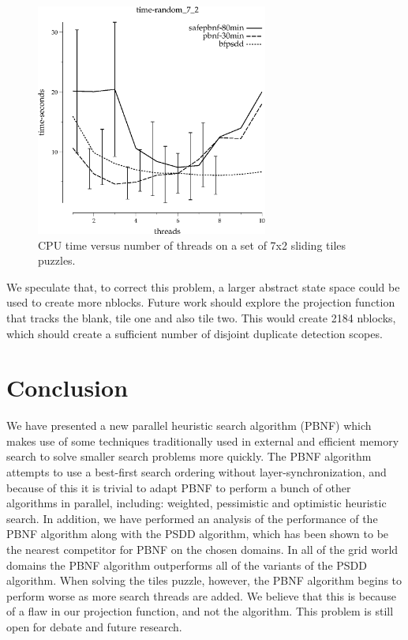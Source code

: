 \documentclass{article}
\begin{document}
\begin{figure}[t]
\begin{center}
\includegraphics[width=3in]{../graphs/tiles_random_7_2/time-random_7_2.eps}
\caption{CPU time versus number of threads on a set of 7x2 sliding
  tiles puzzles.}
\label{fig:tiles-7x2}
\end{center}
\end{figure}

We speculate that, to correct this problem, a larger abstract state
space could be used to create more nblocks.  Future work should
explore the projection function that tracks the blank, tile one and
also tile two.  This would create 2184 nblocks, which should create a
sufficient number of disjoint duplicate detection scopes.

\section{Conclusion}

We have presented a new parallel heuristic search algorithm (PBNF)
which makes use of some techniques traditionally used in external and
efficient memory search to solve smaller search problems more quickly.
The PBNF algorithm attempts to use a best-first search ordering
without layer-synchronization, and because of this it is trivial to
adapt PBNF to perform a bunch of other algorithms in parallel,
including: weighted, pessimistic and optimistic heuristic search.  In
addition, we have performed an analysis of the performance of the PBNF
algorithm along with the PSDD algorithm, which has been shown to be
the nearest competitor for PBNF on the chosen domains.  In all of the
grid world domains the PBNF algorithm outperforms all of the variants
of the PSDD algorithm.  When solving the tiles puzzle, however, the
PBNF algorithm begins to perform worse as more search threads are
added.  We believe that this is because of a flaw in our projection
function, and not the algorithm.  This problem is still open for
debate and future research.
\end{document}
